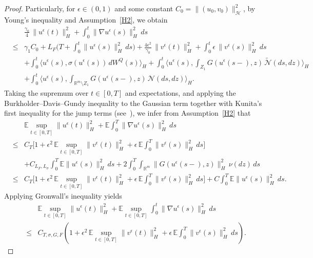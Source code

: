 \documentclass[11pt]{article}
\theoremstyle{plain}
\numberwithin{equation}{section}
\begin{document}
\begin{proof}
 Particularly, for $\epsilon\in(0,1)$ and some constant $C_0=\|(u_0,v_0)\|_{\mathcal H}^2$, by Young's inequality and
Assumption~\ref{H2}, we obtain
\begin{eqnarray}
&& \frac{\gamma_0}{4}\,\|u^{\epsilon}(t)\|_{H}^2
+ \int_0^t \|\nabla u^{\epsilon}(s)\|_{H}^2\,ds \nonumber\\
&\leq&
\gamma_1 C_0
+ L_F\Big(T + \int_0^t \|u^{\epsilon}(s)\|_{H}^2\,ds\Big)
+ \frac{4\epsilon^2}{\gamma_0}\,\|v^{\epsilon}(t)\|_{H}^2
+ \int_0^t \epsilon\,\|v^{\epsilon}(s)\|_{H}^2\,ds \nonumber\\
&&
+ \int_0^t \langle u^{\epsilon}(s),
\sigma(u^{\epsilon}(s))\,dW^Q(s)\rangle_H  + \int_0^t \Big\langle u^{\epsilon}(s),
\int_{Z_1} G(u^{\epsilon}(s-),z)\,\tilde{\mathcal N}(ds,dz) \Big\rangle_H \nonumber\\
&&
+ \int_0^t \Big\langle u^{\epsilon}(s),
\int_{\mathbb R^m\setminus Z_1} G(u^{\epsilon}(s-),z)\,{\mathcal N}(ds,dz) \Big\rangle_H .
\end{eqnarray}
Taking the supremum over $t\in[0,T]$ and expectations, and applying
the Burkholder--Davis--Gundy inequality to the Gaussian term together with Kunita's first inequality for the jump terms (see~\cite[Theorem~4.4.23]{Applebaum}),
we infer from Assumption~\ref{H2} that
\begin{eqnarray}
&& \mathbb{E}\sup_{t\in[0,T]}\|u^{\epsilon}(t)\|_{H}^2
+ \mathbb{E}\int_0^T \|\nabla u^{\epsilon}(s)\|_{H}^2\,ds \nonumber\\
&\leq&
C_T\Big[1 + \epsilon^2\,\mathbb{E}\sup_{t\in[0,T]}\|v^{\epsilon}(t)\|_{H}^2+ \epsilon\,\mathbb{E}\int_0^T \|v^{\epsilon}(s)\|_{H}^2\,ds\Big] \nonumber\\
&&+ C_{L_F,L_\sigma}\int_0^T \mathbb{E}\|u^{\epsilon}(s)\|_{H}^2\,ds+ 2\int_0^T \int_{\mathbb R^m} \|G(u^{\epsilon}(s-),z)\|_{H}^2\,\nu(dz)\,ds \nonumber\\
&\leq& C_T\Big[ 1 + \epsilon^2\,\mathbb{E}\sup_{t\in[0,T]}\|v^{\epsilon}(t)\|_{H}^2+ \epsilon\,\mathbb{E}\int_0^T \|v^{\epsilon}(s)\|_{H}^2\,ds
\Big]  + C\int_0^T \mathbb{E}\|u^{\epsilon}(s)\|_{H}^2\,ds .
\end{eqnarray}
Applying Gronwall's inequality yields
\begin{eqnarray}\label{lemma1-3}
&&  \mathbb{E}\sup_{t\in [0,T]}\|u^{\epsilon }(t)\|_{H}^2+  \mathbb{E}\sup_{t\in [0,T]}\int_0^t \|\nabla u^{\epsilon }(s)\|_{H}^2\,ds \nonumber\\
&\leq& C_{T,\sigma,G,F}\left(1+ \epsilon^2\,\mathbb{E}\sup_{t\in [0,T]}\| v^{\epsilon}(t)\|_{H}^2+ \epsilon\,\mathbb{E}\int_0^T \|v^{\epsilon}(s)\|_{H}^2\,ds\right).

\end{eqnarray}
\end{proof}
\end{document}
